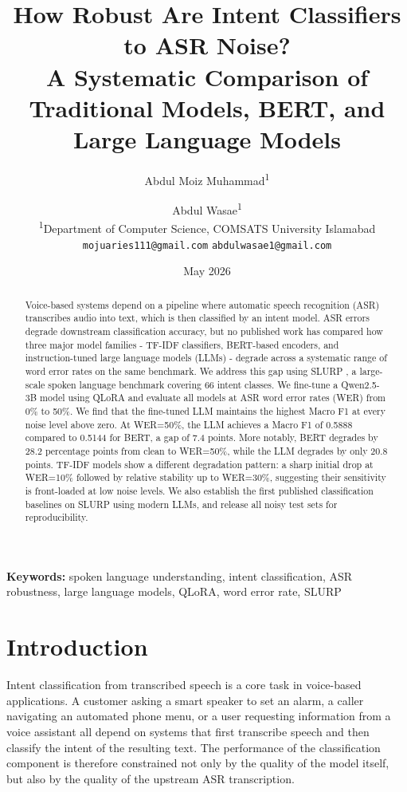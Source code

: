 \documentclass[11pt,a4paper]{article}
\title{\textbf{How Robust Are Intent Classifiers to ASR Noise?\\
A Systematic Comparison of Traditional Models, BERT, and Large Language Models}}
\author{
    Abdul Moiz Muhammad\textsuperscript{1} \and
    Abdul Wasae\textsuperscript{1}
    \\[0.5em]
    \textsuperscript{1}Department of Computer Science, COMSATS University Islamabad\\
    \texttt{mojuaries111@gmail.com} \quad \texttt{abdulwasae1@gmail.com}
}
\date{May 2026}
\begin{document}
\maketitle

\begin{abstract}
Voice-based systems depend on a pipeline where automatic speech recognition (ASR) transcribes audio into text, which is then classified by an intent model. ASR errors degrade downstream classification accuracy, but no published work has compared how three major model families - TF-IDF classifiers, BERT-based encoders, and instruction-tuned large language models (LLMs) - degrade across a systematic range of word error rates on the same benchmark. We address this gap using SLURP \citep{bastianelli2020slurp}, a large-scale spoken language benchmark covering 66 intent classes. We fine-tune a Qwen2.5-3B model using QLoRA and evaluate all models at ASR word error rates (WER) from 0\% to 50\%. We find that the fine-tuned LLM maintains the highest Macro F1 at every noise level above zero. At WER=50\%, the LLM achieves a Macro F1 of 0.5888 compared to 0.5144 for BERT, a gap of 7.4 points. More notably, BERT degrades by 28.2 percentage points from clean to WER=50\%, while the LLM degrades by only 20.8 points. TF-IDF models show a different degradation pattern: a sharp initial drop at WER=10\% followed by relative stability up to WER=30\%, suggesting their sensitivity is front-loaded at low noise levels. We also establish the first published classification baselines on SLURP using modern LLMs, and release all noisy test sets for reproducibility.
\end{abstract}

\textbf{Keywords:} spoken language understanding, intent classification, ASR robustness, large language models, QLoRA, word error rate, SLURP

\section{Introduction}

Intent classification from transcribed speech is a core task in voice-based applications. A customer asking a smart speaker to set an alarm, a caller navigating an automated phone menu, or a user requesting information from a voice assistant all depend on systems that first transcribe speech and then classify the intent of the resulting text. The performance of the classification component is therefore constrained not only by the quality of the model itself, but also by the quality of the upstream ASR transcription.
\end{document}
